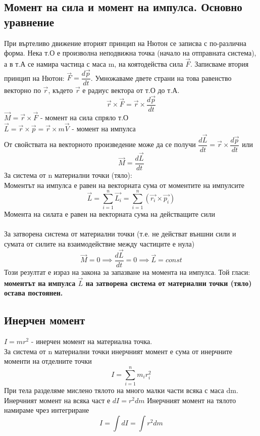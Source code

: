 \documentclass[fleqn, 12pt]{article}
\begin{document}
\subsection{Момент на сила и момент на импулса. Основно уравнение}

При въртеливо движение вторият принцип на Нютон се записва с по-различна форма. Нека т.О е произволна неподвижна точка (начало на отправната система), а в т.А се намира частица с маса m, на коятодейства сила $\vec{F}$. Записваме втория принцип на Нютон: $\vec{F} = \dfrac{d \vec{p}}{dt}$. Умножаваме двете страни на това равенство векторно по $\vec{r}$, където $\vec{r}$ е радиус вектора от т.О до т.А. 
$$\vec{r} \times \vec{F} = \vec{r} \times \dfrac{d \vec{p}}{dt} $$
$\vec{M} = \vec{r} \times \vec{F} $ - момент на сила спряло т.О \\
$\vec{L} = \vec{r} \times \vec{p} = \vec{r} \times m\vec{V}$  - момент на импулса \\
От свойствата на векторното произведение може да се получи $\dfrac{d \vec{L}}{dt} =  \vec{r} \times \dfrac{d \vec{p}}{dt}$ или
$$\vec{M} = \dfrac{d \vec{L}}{dt}$$
За система от n материални точки (тяло): \\
Моментът на импулса е равен на векторната сума от моментите на импулсите 
$$\vec{L} = \sum_{i=1} ^n \vec{L_i} = \sum_{i=1} ^n \left( \vec{r_i} \times \vec{p_i} \right)  $$
Момента на силата е равен на векторната сума на действащите сили \\
\\
За затворена система от материални точки (т.е. не действат външни сили и сумата от силите на взаимодействие между частиците е нула) 
$$\vec{M} = 0 \implies \dfrac{d \vec{L}}{dt} = 0 \implies \vec{L} = const$$
Този резултат е израз на закона за запазване на момента на импулса. Той гласи: \textbf{моментът на импулса $\vec{L}$ на затворена система от материални точки (тяло) остава постоянен.}

\subsection{Инерчен момент}
$I = mr^2$ - инерчен момент на материална точка. \\
За система от n материални точки инерчният момент е сума от инерчните моменти на отделните точки 
$$I = \sum_{i=1} ^n m_i r_i^2$$
При тела разделяме мислено тялото на много малки части всяка с маса dm. Инерчният момент на всяка част е $dI = r^2dm$ Инерчният момент на тялото намираме чрез интегриране
$$I = \int dI = \int r^2dm $$
\end{document}
